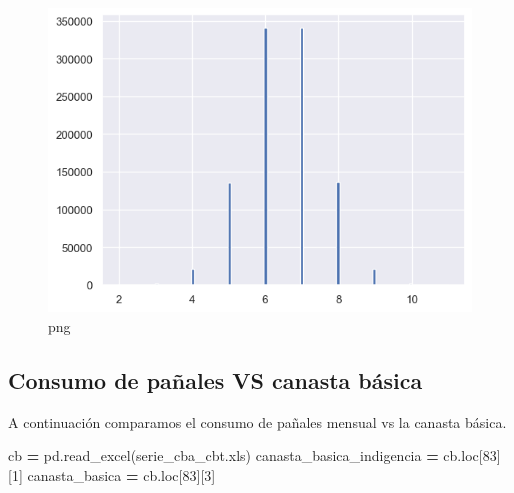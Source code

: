 \documentclass[
]{article}
\newenvironment{Shaded}{\begin{snugshade}}{\end{snugshade}}
\newcommand{\DecValTok}[1]{\textcolor[rgb]{0.00,0.00,0.81}{#1}}
\newcommand{\NormalTok}[1]{#1}
\newcommand{\OperatorTok}[1]{\textcolor[rgb]{0.81,0.36,0.00}{\textbf{#1}}}
\newcommand{\StringTok}[1]{\textcolor[rgb]{0.31,0.60,0.02}{#1}}
\begin{document}
\begin{figure}
\centering
\includegraphics{output_13_0.png}
\caption{png}
\end{figure}

\begin{Shaded}
\begin{Highlighting}[]

\end{Highlighting}
\end{Shaded}

\hypertarget{consumo-de-pauxf1ales-vs-canasta-buxe1sica}{%
\subsection{Consumo de pañales VS canasta
básica}\label{consumo-de-pauxf1ales-vs-canasta-buxe1sica}}

A continuación comparamos el consumo de pañales mensual vs la canasta
básica.

\begin{Shaded}
\begin{Highlighting}[]
\NormalTok{cb }\OperatorTok{=}\NormalTok{ pd.read\_excel(}\StringTok{\textquotesingle{}serie\_cba\_cbt.xls\textquotesingle{}}\NormalTok{)}
\NormalTok{canasta\_basica\_indigencia }\OperatorTok{=}\NormalTok{ cb.loc[}\DecValTok{83}\NormalTok{][}\DecValTok{1}\NormalTok{]}
\NormalTok{canasta\_basica }\OperatorTok{=}\NormalTok{ cb.loc[}\DecValTok{83}\NormalTok{][}\DecValTok{3}\NormalTok{]}
\end{Highlighting}
\end{Shaded}
\end{document}
